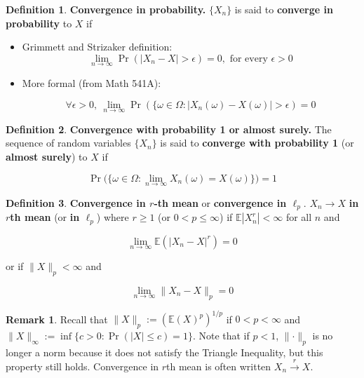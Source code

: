 \documentclass{article}
\newcommand{\E}{\mathbb{E}}
\theoremstyle{definition}
\theoremstyle{definition}
\theoremstyle{definition}
\theoremstyle{definition}
\theoremstyle{definition}
\newtheorem{definition}{Definition}[section]
\newtheorem*{remark}{Remark}
\theoremstyle{definition}
\theoremstyle{definition}
\begin{document}
\begin{definition} \textbf{Convergence in probability.} \(\{X_n\}\) is said to \textbf{converge in probability} to \(X\) if
\begin{itemize}

\item Grimmett and Strizaker definition:
\[
\lim_{n \to \infty} \Pr(|X_n -X| > \epsilon) = 0, \text{ for every } \epsilon > 0
\]

\item More formal (from Math 541A):

\[
\forall \epsilon > 0, \ \lim_{n \to \infty} \Pr(\{\omega \in \Omega : |X_n(\omega) - X(\omega)| > \epsilon) = 0
\]

\end{itemize}

\end{definition} 

\begin{definition}
\textbf{Convergence with probability 1 or almost surely.} The sequence of random variables \(\{X_n\}\) is said to \textbf{converge with probability 1} (or \textbf{almost surely}) to \(X\) if 



\[
\Pr\big( \{\omega \in \Omega: \lim_{n \to \infty} X_n(\omega) = X(\omega) \} \big) = 1
\]




\end{definition}

\begin{definition}
\textbf{Convergence in \(r\)-th mean} or \textbf{convergence in \(\ell_p\)}. \(X_n \to X\) \textbf{in \(r\)th mean}  (or \textbf{in \(\ell_p\)}) where \(r \geq 1\) (or \(0 < p \leq \infty\)) if \(\E|X_n^r| < \infty\) for all \(n\) and

\[
\lim_{n \to \infty} \E(|X_n - X|^r) = 0
\]

or if \(\lVert X \rVert_p < \infty\) and

\[
\lim_{n \to \infty} \lVert X_n - X \rVert _p = 0
\]

\begin{remark}
Recall that \(\lVert X \rVert_p := (\E(X)^p)^{1/p}\) if \(0 < p < \infty\) and \(\lVert X \rVert_\infty := \inf \{c >0: \Pr(|X| \leq c ) = 1\}\). Note that if \(p < 1\), \(\lVert \cdot \rVert_p\) is no longer a norm because it does not satisfy the Triangle Inequality, but this property still holds. Convergence in \(r\)th mean is often written \(X_n \xrightarrow{r} X\).
\end{remark}
\end{definition}
\end{document}
